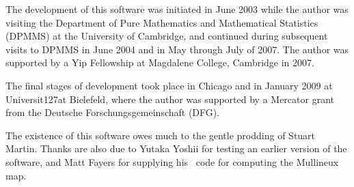 

The development of this software was initiated in June 2003 while the
author was visiting the Department of Pure Mathematics and
Mathematical Statistics (DPMMS) at the University of Cambridge, and
continued during subsequent visits to DPMMS in June 2004 and in May
through July of 2007.  The author was supported by a Yip Fellowship at
Magdalene College, Cambridge in 2007.

The final stages of development took place in Chicago and in January
2009 at Universit\accent127at Bielefeld, where the author was
supported by a Mercator grant from the Deutsche Forschungsgemeinschaft
(DFG).

\bigskip

The existence of this software owes much to the gentle prodding of
Stuart Martin. Thanks are also due to Yutaka Yoshii for testing an
earlier version of the software, and Matt Fayers for supplying his
\GAP\ code for computing the Mullineux map. 



